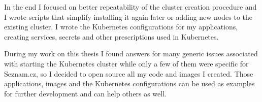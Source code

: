 In the end I focused on better repeatability of the cluster creation procedure and I wrote scripts that simplify installing it again later or adding new nodes to the existing cluster. I wrote the Kubernetes configurations for my applications, creating services, secrets and other prescriptions used in Kubernetes.

During my work on this thesis I found answers for many generic issues associated with starting the Kubernetes cluster while only a few of them were specific for Seznam.cz, so I decided to open source all my code and images I created. Those applications, images and the Kubernetes configurations can be used as examples for further development and can help others as well.

